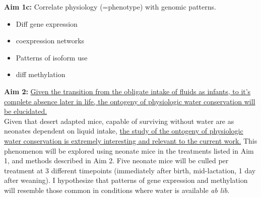 \documentclass[11pt]{article}
\begin{document}
\noindent \textbf{Aim 1c:} Correlate physiology (=phenotype) with genomic patterns. \\

\begin{itemize}
\item Diff gene expression
\item coexpression networks
\item Patterns of isoform use
\item diff methylation
\end{itemize}





\noindent \textbf{Aim 2:} \ul{Given the transition from the obligate intake of fluids as infants, to it’s complete absence later in life, the ontogeny of physiologic water conservation will be elucidated.} \\

Given that desert adapted mice, capable of surviving without water are as neonates dependent on liquid intake, \ul{the study of the ontogeny of physiologic water conservation is extremely interesting and relevant to the current work.} This phenomenon will be explored using neonate mice in the treatments listed in Aim 1, and methods described in Aim 2. Five neonate mice will be culled per treatment at 3 different timepoints (immediately after birth, mid-lactation, 1 day after weaning). I hypothesize that patterns of gene expression and methylation will resemble those common in conditions where water is available \textit{ab lib}.  \\
\end{document}
